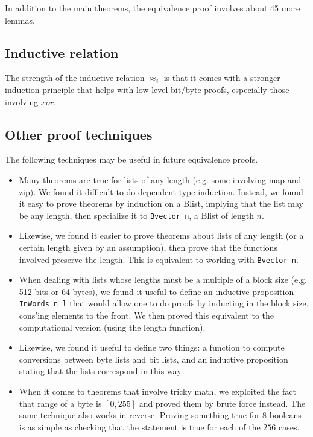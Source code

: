 \documentclass[twocolumn,showpacs,%
  nofootinbib,aps,superscriptaddress,%
  eqsecnum,prd,notitlepage,showkeys,10pt]{revtex4-1}
\begin{document}
In addition to the main theorems, the equivalence proof involves about 45 more lemmas.

\subsection{Inductive relation}
The strength of the inductive relation $\approx_i$ is that it comes with a stronger induction principle that helps with low-level bit/byte proofs, especially those involving $xor$.

\subsection{Other proof techniques}

The following techniques may be useful in future equivalence proofs.

\begin{itemize}
\item Many theorems are true for lists of any length (e.g. some involving map and zip). We found it difficult to do dependent type induction. Instead, we found it easy to prove theorems by induction on a Blist, implying that the list may be any length, then specialize it to \verb|Bvector n|, a Blist of length $n$. 
\item Likewise, we found it easier to prove theorems about lists of any length (or a certain length given by an assumption), then prove that the functions involved preserve the length. This is equivalent to working with \verb|Bvector n|. %
\item When dealing with lists whose lengths must be a multiple of a block size (e.g. 512 bits or 64 bytes), we found it useful to define an inductive proposition \verb|InWords n l| that would allow one to do proofs by inducting in the block size, cons'ing elements to the front. We then proved this equivalent to the computational version (using the length function). %
\item Likewise, we found it useful to define two things: a function to compute conversions between byte lists and bit lists, and an inductive proposition stating that the lists correspond in this way.
\item When it comes to theorems that involve tricky math, we exploited the fact that range of a byte is $[0, 255]$ and proved them by brute force instead. The same technique also works in reverse. Proving something true for $8$ booleans is as simple as checking that the statement is true for each of the $256$ cases. %
\end{itemize}
\end{document}
